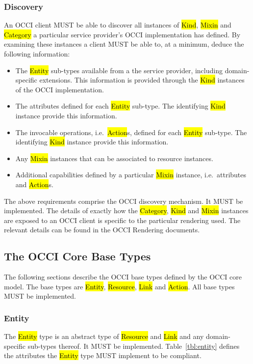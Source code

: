 \documentclass[10pt,a4paper]{article}
\begin{document}
\subsubsection{Discovery}
\label{sec:discovery}
An OCCI client MUST be able to discover all instances of \hl{Kind}, \hl{Mixin}
and \hl{Category} a particular service provider's OCCI implementation has
defined. By examining these instances a client MUST be able to, at a minimum,
deduce the following information:
\begin{itemize}
\item The \hl{Entity} sub-types available from a the service provider,
 including domain-specific extensions. This information is provided through the
 \hl{Kind} instances of the OCCI implementation.
\item The attributes defined for each \hl{Entity} sub-type. The identifying
 \hl{Kind} instance provide this information.
\item The invocable operations, i.e.~\hl{Action}s, defined for each \hl{Entity}
 sub-type. The identifying \hl{Kind} instance provide this information.
\item Any \hl{Mixin} instances that can be associated to resource instances.
\item Additional capabilities defined by a particular \hl{Mixin} instance,
 i.e.~attributes and \hl{Action}s.
\end{itemize}
The above requirements comprise the OCCI discovery mechanism. It MUST be
implemented.
%
The details of exactly how the \hl{Category}, \hl{Kind} and \hl{Mixin}
instances are exposed to an OCCI client is specific to the particular rendering
used.
The relevant details can be found in the OCCI Rendering documents.


\subsection{The OCCI Core Base Types}
\label{sec:base_types}
The following sections describe the OCCI base types defined by the OCCI core model.
The base types are \hl{Entity}, \hl{Resource}, \hl{Link} and \hl{Action}. All
base types MUST be implemented.

\subsubsection{Entity}
\label{sec:entity}
The \hl{Entity} type is an abstract type of
\hl{Resource} and \hl{Link} and any domain-specific sub-types thereof. It MUST
be implemented.
%
Table~\ref{tbl:entity} defines the attributes the \hl{Entity} type MUST implement to
be compliant.
\end{document}
